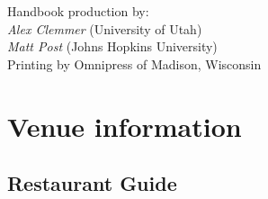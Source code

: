 \documentclass[twoside,makeidx]{book}
\begin{document}
\fancyfoot[C]{}


\fancyfoot[C]{\thepage}

\thispagestyle{empty}
\mbox{}

\vfill
\noindent Handbook production by: \\ 
\indent \emph{Alex Clemmer} (University of Utah) \\
\indent \emph{Matt Post} (Johns Hopkins University) \\  
Printing by Omnipress of Madison, Wisconsin
\newpage

\frontmatter

\clearpage

\clearpage

\clearpage%
\setheaders{}{}

\clearpage
%
\clearpage%
\setheaders{}{}

\setcounter{tocdepth}{2}
\tableofcontents
\mainmatter
\pagestyle{fancy}

%
\clearpage




% 
%
% 
%  
%  
%  




\chapter{Venue information}

\clearpage
\section{Restaurant Guide}


\clearpage
{}


\cleardoublepage
{}
\printindex
\end{document}
